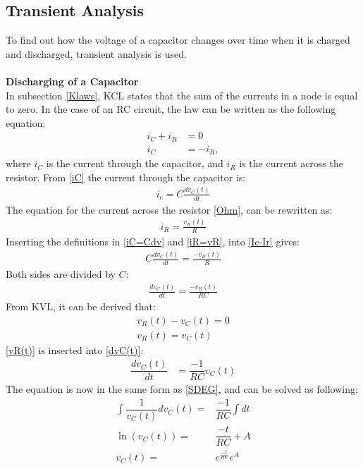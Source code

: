 \subsection{Transient Analysis}
\label{sec371}
To find out how the voltage of a capacitor changes over time when it is charged and discharged, transient analysis is used.
\\
\\
\textbf{Discharging of a Capacitor}\\
In subsection \ref{Klaws}, KCL states that the sum of the currents in a node is equal to zero. In the case of an RC circuit, the law can be written as the following equation:
\begin{align}
i_{C}+i_{R}&=0 \nonumber \\
i_{C}&= -i_{R}, \label{Ic-Ir}
\end{align}
where $i_C$ is the current through the capacitor, and $i_R$ is the current across the resistor. From \eqref{iC} the current through the capacitor is:
\begin{align}
	i_c = C\frac{dv_C(t)}{dt}\label{iC=Cdv}
\end{align}
The equation for the current across the resistor \eqref{Ohm}, can be rewritten as:
\begin{align}
	i_R = \frac{v_R(t)}{R}\label{iR=vR}
\end{align}
Inserting the definitions in \eqref{iC=Cdv} and \eqref{iR=vR}, into \eqref{Ic-Ir} gives:
\begin{align*}
	C\frac{dv_C(t)}{dt} = \frac{-v_R(t)}{R}
\end{align*}
Both sides are divided by $C$:
\begin{align}
	\frac{dv_C(t)}{dt} = \frac{-v_R(t)}{RC}\label{dvC(t)}
\end{align}
From KVL, it can be derived that:
\begin{align}
	v_R(t) - v_C(t) = 0\nonumber\\
	v_R(t) = v_C(t) \label{vR(t)}
\end{align}
\eqref{vR(t)} is inserted into \eqref{dvC(t)}:
\begin{align*}
	\dfrac{dv_C(t)}{dt} &= \dfrac{-1}{RC}v_C(t)
\end{align*}
The equation is now in the same form as \eqref{SDEG}, and can be solved as following:
\begin{align}
\int \dfrac{1}{v_C(t)}dv_C(t) =& \dfrac{-1}{RC} \int dt\nonumber \\
\ln(v_C(t)) =& \dfrac{-t}{RC} + A \nonumber\\
v_C(t) =& e^{\frac{-t}{RC}}e^{A}\label{V_eA}
\end{align}

